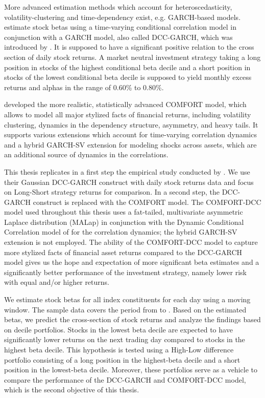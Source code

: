\documentclass[11pt,a4paper]{article}
\begin{document}
More advanced estimation methods which account for heteroscedasticity, volatility-clustering and time-dependency exist, e.g. GARCH-based models.  estimate stock betas using a time-varying conditional correlation model in conjunction with a GARCH model, also called DCC-GARCH, which was introduced by . It is supposed to have a significant positive relation to the cross section of daily stock returns. A market neutral investment strategy taking a long position in stocks of the highest conditional beta decile and a short position in stocks of the lowest conditional beta decile is supposed to yield monthly excess returns and alphas in the range of 0.60\% to 0.80\%.

 developed the more realistic, statistically advanced COMFORT model, which allows to model all major stylized facts of financial returns, including volatility clustering, dynamics in the dependency structure, asymmetry, and heavy tails. It supports various extensions which account for time-varying correlation dynamics and a hybrid GARCH-SV extension for modeling shocks across assets, which are an additional source of dynamics in the correlations.

This thesis replicates in a first step the empirical study conducted by . We use their Gaussian DCC-GARCH construct with daily stock returns data and focus on Long-Short strategy returns for comparison. In a second step, the DCC-GARCH construct is replaced with the COMFORT model. The COMFORT-DCC model used throughout this thesis uses a fat-tailed, multivariate asymmetric Laplace distribution (MALap) in conjunction with the Dynamic Conditional Correlation model of  for the correlation dynamics; the hybrid GARCH-SV extension is not employed. The ability of the COMFORT-DCC model to capture more stylized facts of financial asset returns compared to the DCC-GARCH model gives us the hope and expectation of more significant beta estimates and a significantly better performance of the investment strategy, namely lower risk with equal and/or higher returns.

We estimate stock betas for all \indexName{} index constituents for each day using a moving window. The sample data covers the period from \periodFrom{} to \periodTo{}. Based on the estimated betas, we predict the cross-section of stock returns and analyze the findings based on decile portfolios. Stocks in the lowest beta decile are expected to have significantly lower returns on the next trading day compared to stocks in the highest beta decile. This hypothesis is tested using a High-Low difference portfolio consisting of a long position in the highest-beta decile and a short position in the lowest-beta decile. Moreover, these portfolios serve as a vehicle to compare the performance of the DCC-GARCH and COMFORT-DCC model, which is the second objective of this thesis.
\end{document}
